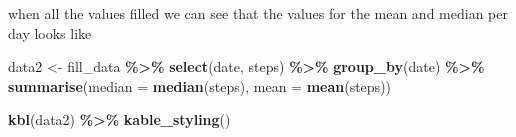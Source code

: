\documentclass[
]{article}
\newenvironment{Shaded}{\begin{snugshade}}{\end{snugshade}}
\newcommand{\AttributeTok}[1]{\textcolor[rgb]{0.13,0.29,0.53}{#1}}
\newcommand{\FunctionTok}[1]{\textcolor[rgb]{0.13,0.29,0.53}{\textbf{#1}}}
\newcommand{\NormalTok}[1]{#1}
\newcommand{\OtherTok}[1]{\textcolor[rgb]{0.56,0.35,0.01}{#1}}
\newcommand{\SpecialCharTok}[1]{\textcolor[rgb]{0.81,0.36,0.00}{\textbf{#1}}}
\begin{document}
when all the values filled we can see that the values for the mean and
median per day looks like

\begin{Shaded}
\begin{Highlighting}[]
\NormalTok{data2 }\OtherTok{\textless{}{-}}\NormalTok{ fill\_data }\SpecialCharTok{\%\textgreater{}\%} 
        \FunctionTok{select}\NormalTok{(date, steps) }\SpecialCharTok{\%\textgreater{}\%} 
        \FunctionTok{group\_by}\NormalTok{(date) }\SpecialCharTok{\%\textgreater{}\%} 
        \FunctionTok{summarise}\NormalTok{(}\AttributeTok{median =} \FunctionTok{median}\NormalTok{(steps), }\AttributeTok{mean =} \FunctionTok{mean}\NormalTok{(steps))}

\FunctionTok{kbl}\NormalTok{(data2) }\SpecialCharTok{\%\textgreater{}\%} 
        \FunctionTok{kable\_styling}\NormalTok{()}
\end{Highlighting}
\end{Shaded}
\end{document}
